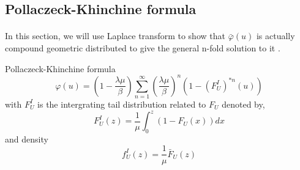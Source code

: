 \documentclass[project2.tex]{subfiles}
\begin{document}
\subsection{Pollaczeck-Khinchine formula}
\paragraph{}
In this section, we will use Laplace transform to show that $\bar{\varphi}(u)$ is actually compound geometric distributed to give the general n-fold solution to it .
\begin{theorem}Pollaczeck-Khinchine formula
$$\varphi(u)=(1-\frac{\lambda\mu}{\beta})\sum^{\infty}_{n=1}(\frac{\lambda\mu}{\beta})^n(1-(F_U^I)^{*n}(u))$$
with $F_U^I$ is the intergrating tail distribution related to $F_U$ denoted by,
$$F_U^I(z)=\frac{1}{\mu}\int_0^z(1-F_U(x))dx$$ and density
$$f_U^I(z)=\frac{1}{\mu}\bar{F}_U(z)$$
\end{theorem}
\end{document}
